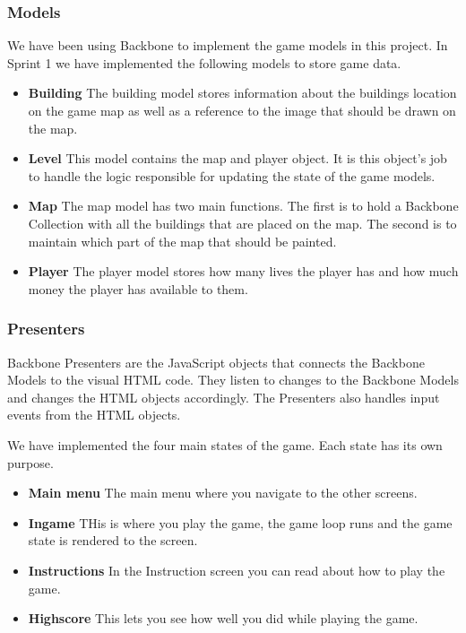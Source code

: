 \subsubsection*{Models}
	We have been using Backbone to implement the game models in this project. In Sprint 1 we have implemented 
	the following models to store game data.
	\begin{itemize}
		\item {\bf Building}
		The building model stores information about the buildings location on the game map as well as a reference 
		to the image that should be drawn on the map.
		\item {\bf Level}
		This model contains the map and player object. It is this object's job to handle the logic responsible for 
		updating the state of the game models.
		\item {\bf Map}
		The map model has two main functions. The first is to hold a Backbone Collection with all the buildings 
		that are placed on the map. The second is to maintain which part of the map that should be painted.
		\item {\bf Player} 
		The player model stores how many lives the player has and how much money the player has available to them.
	\end{itemize}

\subsubsection*{Presenters}
	Backbone Presenters are the JavaScript objects that connects the Backbone Models 
	to the visual HTML code. They listen to changes to the Backbone Models and changes 
	the HTML objects accordingly. The Presenters also handles input events from the HTML objects.
	
	We have implemented the four main states of the game. Each state has its own purpose.
	\begin{itemize}
		\item {\bf Main menu} The main menu where you navigate to the other screens.
		\item {\bf Ingame} THis is where you play the game, the game loop runs 
		and the game state is rendered to the screen.
		\item {\bf Instructions} In the Instruction screen you can read about how to play the game.
		\item {\bf Highscore} This lets you see how well you did while playing the game.
	\end{itemize}
	
